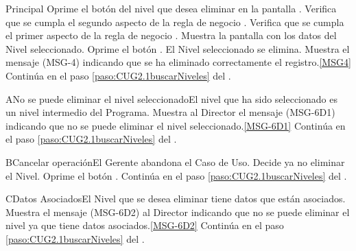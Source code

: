 	\begin{UCtrayectoria}{Principal}
			\UCpaso[\UCactor] Oprime el botón  del nivel que desea eliminar en la pantalla .
			\UCpaso Verifica que se cumpla el segundo aspecto de la regla de negocio .
			\UCpaso Verifica que se cumpla el primer aspecto de la regla de negocio . 
			\UCpaso Muestra la pantalla  con los datos del Nivel seleccionado. 
			\UCpaso [\UCactor] Oprime el botón . 
			\UCpaso El Nivel seleccionado se elimina.
			\UCpaso Muestra el mensaje (MSG-4) indicando que se ha eliminado correctamente el registro.\ref{MSG4}
			\UCpaso Continúa en el paso \ref{paso:CUG2.1buscarNiveles} del .
	\end{UCtrayectoria}

		\begin{UCtrayectoriaA}{A}{No se puede eliminar el nivel seleccionado}{El nivel que ha sido seleccionado es un nivel intermedio del Programa.}
			\UCpaso Muestra al Director el mensaje (MSG-6D1) indicando que no se puede eliminar el nivel seleccionado.\ref{MSG-6D1}
			\UCpaso Continúa en el paso \ref{paso:CUG2.1buscarNiveles} del .
		\end{UCtrayectoriaA}

		\begin{UCtrayectoriaA}{B}{Cancelar operación}{El Gerente abandona el Caso de Uso.}
			\UCpaso[\UCactor] Decide ya no eliminar el Nivel.
			\UCpaso[\UCactor] Oprime el botón .
			\UCpaso Continúa en el paso \ref{paso:CUG2.1buscarNiveles} del .
		\end{UCtrayectoriaA}
		
		\begin{UCtrayectoriaA}{C}{Datos Asociados}{El Nivel que se desea eliminar tiene datos que están asociados.}
			\UCpaso Muestra el mensaje (MSG-6D2) al Director indicando que no se puede eliminar el nivel ya que tiene datos asociados.\ref{MSG-6D2}
			\UCpaso Continúa en el paso \ref{paso:CUG2.1buscarNiveles} del .
		\end{UCtrayectoriaA}
